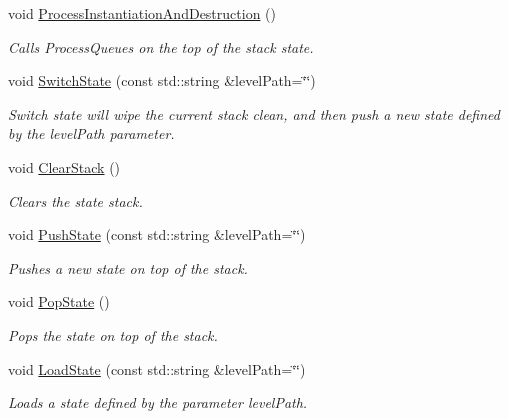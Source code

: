 \begin{DoxyCompactItemize}
\mbox{\label{classStateManager_ac88d4e1ff5fab43b754bd3831be4ca97}} 
void \hyperlink{classStateManager_ac88d4e1ff5fab43b754bd3831be4ca97}{Process\+Instantiation\+And\+Destruction} ()
\begin{DoxyCompactList}\small\item\em Calls Process\+Queues on the top of the stack state. \end{DoxyCompactList}\item 
void \hyperlink{classStateManager_aca3d023f833f9b85b28668e3d3acd2d3}{Switch\+State} (const std\+::string \&level\+Path=\char`\"{}\char`\"{})
\begin{DoxyCompactList}\small\item\em Switch state will wipe the current stack clean, and then push a new state defined by the level\+Path parameter. \end{DoxyCompactList}\item 
\mbox{\label{classStateManager_a59a5d52d71d785b267f50f386b554787}} 
void \hyperlink{classStateManager_a59a5d52d71d785b267f50f386b554787}{Clear\+Stack} ()
\begin{DoxyCompactList}\small\item\em Clears the state stack. \end{DoxyCompactList}\item 
void \hyperlink{classStateManager_a608027305a6a97bdbc958c7e68fcb5bc}{Push\+State} (const std\+::string \&level\+Path=\char`\"{}\char`\"{})
\begin{DoxyCompactList}\small\item\em Pushes a new state on top of the stack. \end{DoxyCompactList}\item 
\mbox{\label{classStateManager_a01cd6f5dafc0add0633b0be231cce665}} 
void \hyperlink{classStateManager_a01cd6f5dafc0add0633b0be231cce665}{Pop\+State} ()
\begin{DoxyCompactList}\small\item\em Pops the state on top of the stack. \end{DoxyCompactList}\item 
void \hyperlink{classStateManager_a7d0685d71de4237f8e5162b1a5008d71}{Load\+State} (const std\+::string \&level\+Path=\char`\"{}\char`\"{})
\begin{DoxyCompactList}\small\item\em Loads a state defined by the parameter level\+Path. \end{DoxyCompactList}\item 

\end{DoxyCompactItemize}
